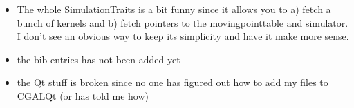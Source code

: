 \begin{itemize}
\item The whole SimulationTraits is a bit funny since it allows you to
  a) fetch a bunch of kernels and b) fetch pointers to the
  movingpointtable and simulator. I don't see an obvious way to keep
  its simplicity and have it make more sense.

\item the bib entries has not been added yet

\item the Qt stuff is broken since no one has figured out how to add
  my files to CGALQt (or has told me how)


\end{itemize}

